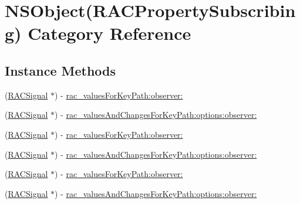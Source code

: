 \hypertarget{category_n_s_object_07_r_a_c_property_subscribing_08}{}\section{N\+S\+Object(R\+A\+C\+Property\+Subscribing) Category Reference}
\label{category_n_s_object_07_r_a_c_property_subscribing_08}
\subsection*{Instance Methods}
\begin{DoxyCompactItemize}
\item 
(\mbox{\hyperlink{interface_r_a_c_signal}{R\+A\+C\+Signal}} $\ast$) -\/ \mbox{\hyperlink{category_n_s_object_07_r_a_c_property_subscribing_08_aa2bf4263a7bab7e6d3223687806cfa4e}{rac\+\_\+values\+For\+Key\+Path\+:observer\+:}}
\item 
(\mbox{\hyperlink{interface_r_a_c_signal}{R\+A\+C\+Signal}} $\ast$) -\/ \mbox{\hyperlink{category_n_s_object_07_r_a_c_property_subscribing_08_a0cfc29dcd9e667013645d785d194fd7e}{rac\+\_\+values\+And\+Changes\+For\+Key\+Path\+:options\+:observer\+:}}
\item 
(\mbox{\hyperlink{interface_r_a_c_signal}{R\+A\+C\+Signal}} $\ast$) -\/ \mbox{\hyperlink{category_n_s_object_07_r_a_c_property_subscribing_08_aa2bf4263a7bab7e6d3223687806cfa4e}{rac\+\_\+values\+For\+Key\+Path\+:observer\+:}}
\item 
(\mbox{\hyperlink{interface_r_a_c_signal}{R\+A\+C\+Signal}} $\ast$) -\/ \mbox{\hyperlink{category_n_s_object_07_r_a_c_property_subscribing_08_a0cfc29dcd9e667013645d785d194fd7e}{rac\+\_\+values\+And\+Changes\+For\+Key\+Path\+:options\+:observer\+:}}
\item 
(\mbox{\hyperlink{interface_r_a_c_signal}{R\+A\+C\+Signal}} $\ast$) -\/ \mbox{\hyperlink{category_n_s_object_07_r_a_c_property_subscribing_08_aa2bf4263a7bab7e6d3223687806cfa4e}{rac\+\_\+values\+For\+Key\+Path\+:observer\+:}}
\item 
(\mbox{\hyperlink{interface_r_a_c_signal}{R\+A\+C\+Signal}} $\ast$) -\/ \mbox{\hyperlink{category_n_s_object_07_r_a_c_property_subscribing_08_a0cfc29dcd9e667013645d785d194fd7e}{rac\+\_\+values\+And\+Changes\+For\+Key\+Path\+:options\+:observer\+:}}
\end{DoxyCompactItemize}


